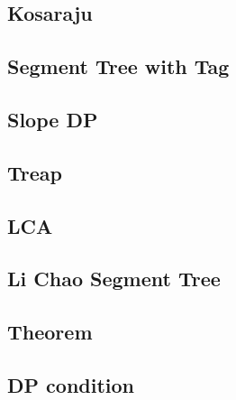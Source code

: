 \subsection{Kosaraju}

\subsection{Segment Tree with Tag}

\subsection{Slope DP} %

\subsection{Treap}

\subsection{LCA}

\subsection{Li Chao Segment Tree}

\subsection{Theorem} %

\subsection{DP condition} %
